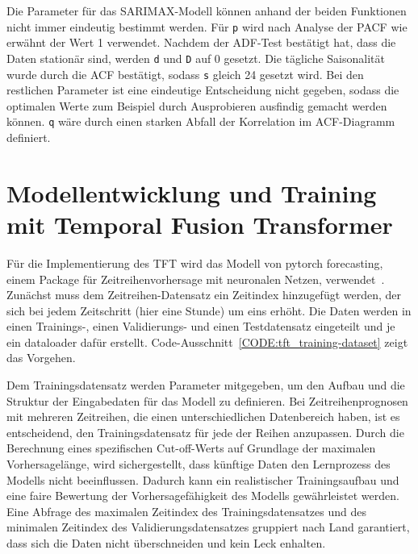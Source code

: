 Die Parameter für das SARIMAX-Modell können anhand der beiden Funktionen nicht immer eindeutig bestimmt werden.
Für \lstinline[columns=fixed]{p} wird nach Analyse der \ac{PACF} wie erwähnt der Wert 1 verwendet.
Nachdem der \ac{ADF}-Test bestätigt hat, dass die Daten stationär sind, werden \lstinline[columns=fixed]{d} und \lstinline[columns=fixed]{D} auf 0 gesetzt.
Die tägliche Saisonalität wurde durch die \ac{ACF} bestätigt, sodass \lstinline[columns=fixed]{s} gleich 24 gesetzt wird.
Bei den restlichen Parameter ist eine eindeutige Entscheidung nicht gegeben, sodass die optimalen Werte zum Beispiel durch Ausprobieren ausfindig gemacht werden können.
\lstinline[columns=fixed]{q} wäre durch einen starken Abfall der Korrelation im \ac{ACF}-Diagramm definiert.

\section{Modellentwicklung und Training mit Temporal Fusion Transformer}
Für die Implementierung des \ac{TFT} wird das Modell von \glqq pytorch forecasting\grqq{}, einem Package für Zeitreihenvorhersage mit neuronalen Netzen, verwendet~\cite{PytorchForecastingDocumentation.20230410T20:05:46.000Z}.
Zunächst muss dem Zeitreihen-Datensatz ein Zeitindex hinzugefügt werden, der sich bei jedem Zeitschritt (hier eine Stunde) um eins erhöht.
Die Daten werden in einen Trainings-, einen Validierungs- und einen Testdatensatz eingeteilt und je ein dataloader dafür erstellt.
Code-Ausschnitt~\ref{CODE:tft_training-dataset} zeigt das Vorgehen.

Dem Trainingsdatensatz werden Parameter mitgegeben, um den Aufbau und die Struktur der Eingabedaten für das Modell zu definieren.
Bei Zeitreihenprognosen mit mehreren Zeitreihen, die einen unterschiedlichen Datenbereich haben, ist es entscheidend, den Trainingsdatensatz für jede der Reihen anzupassen.
Durch die Berechnung eines spezifischen Cut-off-Werts auf Grundlage der maximalen Vorhersagelänge, wird sichergestellt, dass künftige Daten den Lernprozess des Modells nicht beeinflussen.
Dadurch kann ein realistischer Trainingsaufbau und eine faire Bewertung der Vorhersagefähigkeit des Modells gewährleistet werden.
Eine Abfrage des maximalen Zeitindex des Trainingsdatensatzes und des minimalen Zeitindex des Validierungsdatensatzes gruppiert nach Land garantiert, dass sich die Daten nicht überschneiden und kein Leck enhalten.
